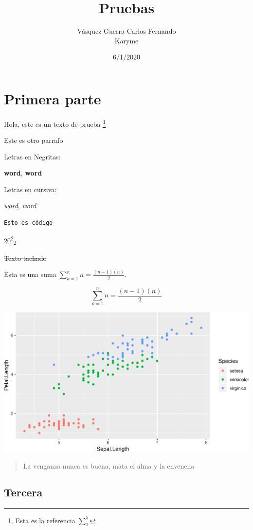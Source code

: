 \documentclass[]{article}
\title{Pruebas}
\author{Vásquez Guerra Carlos Fernando\\
Karyme}
\date{6/1/2020}
\begin{document}
\maketitle

{
\hypersetup{linkcolor=}
\setcounter{tocdepth}{5}
\tableofcontents
}
\hypertarget{primera-parte}{%
\section{Primera parte}\label{primera-parte}}

Hola, este es un texto de prueba \footnote{Esta es la referencia
  \(\sum_1^5\)}

Este es otro parrafo

Letras en Negritas:

\textbf{word}, \textbf{word}

Letras en cursiva:

\emph{word}, \emph{word}

\texttt{Esto\ es\ código}

20\textsuperscript{2}\textsubscript{2}

\sout{Texto tachado}

Esta es una suma \(\sum_{k=1}^nn=\frac{(n-1)(n)}{2}\).

\[
\sum_{k=1}^nn=\frac{(n-1)(n)}{2}
\]

\begin{center}\includegraphics{Pruebas_files/figure-latex/unnamed-chunk-1-1} \end{center}

\begin{quote}
La venganza nunca es buena, mata el alma y la envenena
\end{quote}

\hypertarget{tercera}{%
\subsection{Tercera}\label{tercera}}
\end{document}
